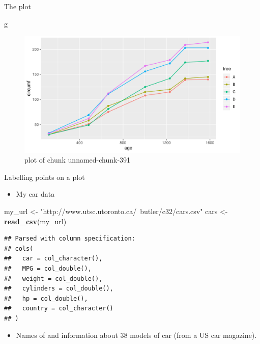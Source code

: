 \documentclass[ignorenonframetext,]{beamer}
\newenvironment{Shaded}{\begin{snugshade}}{\end{snugshade}}
\newcommand{\KeywordTok}[1]{\textcolor[rgb]{0.13,0.29,0.53}{\textbf{#1}}}
\newcommand{\NormalTok}[1]{#1}
\newcommand{\StringTok}[1]{\textcolor[rgb]{0.31,0.60,0.02}{#1}}
\providecommand{\tightlist}{%
  \setlength{\itemsep}{0pt}\setlength{\parskip}{0pt}}
\begin{document}
\begin{frame}[fragile]{The plot}
\protect\hypertarget{the-plot-4}{}

\begin{Shaded}
\begin{Highlighting}[]
\NormalTok{g}
\end{Highlighting}
\end{Shaded}

\begin{figure}
\centering
\includegraphics{figure/unnamed-chunk-391-1.pdf}
\caption{plot of chunk unnamed-chunk-391}
\end{figure}

\end{frame}

\begin{frame}[fragile]{Labelling points on a plot}
\protect\hypertarget{labelling-points-on-a-plot}{}

\begin{itemize}
\tightlist
\item
  My car data
\end{itemize}

\begin{Shaded}
\begin{Highlighting}[]
\NormalTok{my_url <-}\StringTok{ "http://www.utsc.utoronto.ca/~butler/c32/cars.csv"}
\NormalTok{cars <-}\StringTok{ }\KeywordTok{read_csv}\NormalTok{(my_url)}
\end{Highlighting}
\end{Shaded}

\begin{verbatim}
## Parsed with column specification:
## cols(
##   car = col_character(),
##   MPG = col_double(),
##   weight = col_double(),
##   cylinders = col_double(),
##   hp = col_double(),
##   country = col_character()
## )
\end{verbatim}

\begin{itemize}
\tightlist
\item
  Names of and information about 38 models of car (from a US car
  magazine).
\end{itemize}

\end{frame}
\end{document}
